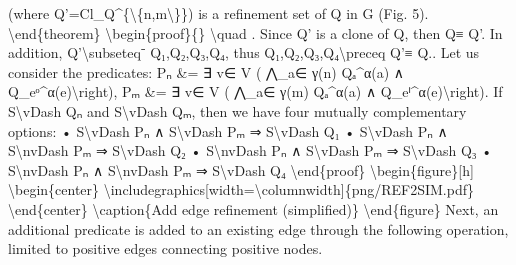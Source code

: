 \documentclass{article}%
\begin{document}
\newline%
(where Q'=Cl\_Q\^{}\{\textbackslash{}\{n,m\textbackslash{}\}\}) is a refinement set of Q in G (Fig. 5).\newline%
\textbackslash{}end\{theorem\}\newline%
\textbackslash{}begin\{proof\}\{\}\newline%
\textbackslash{}quad\newline%
. Since Q' is a clone of Q, then Q≡ Q'. In addition, Q'\textbackslash{}subseteq⁻ Q₁,Q₂,Q₃,Q₄, thus Q₁,Q₂,Q₃,Q₄\textbackslash{}preceq Q'≡ Q.. Let us consider the predicates:\newline%
\newline%
Pₙ \&= ∃ v∈ V ( ⋀\_a∈ γ(n) Qₐ\^{}α(a) ∧ Q\_eᵒ\^{}α(e)\textbackslash{}right),\newline%
Pₘ \&= ∃ v∈ V ( ⋀\_a∈ γ(m) Qₐ\^{}α(a) ∧ Q\_eⁱ\^{}α(e)\textbackslash{}right).\newline%
\newline%
If S\textbackslash{}vDash Qₙ and S\textbackslash{}vDash Qₘ, then we have four mutually complementary options:\newline%
   • S\textbackslash{}vDash Pₙ ∧ S\textbackslash{}vDash Pₘ ⇒ S\textbackslash{}vDash Q₁\newline%
   • S\textbackslash{}vDash Pₙ ∧ S\textbackslash{}nvDash Pₘ ⇒ S\textbackslash{}vDash Q₂\newline%
   • S\textbackslash{}nvDash Pₙ ∧ S\textbackslash{}vDash Pₘ ⇒ S\textbackslash{}vDash Q₃\newline%
   • S\textbackslash{}nvDash Pₙ ∧ S\textbackslash{}nvDash Pₘ ⇒ S\textbackslash{}vDash Q₄\newline%
\textbackslash{}end\{proof\}\newline%
\newline%
\textbackslash{}begin\{figure\}{[}h{]}\newline%
\textbackslash{}begin\{center\}\newline%
\textbackslash{}includegraphics{[}width=\textbackslash{}columnwidth{]}\{png/REF2SIM.pdf\}\newline%
\textbackslash{}end\{center\}\newline%
\textbackslash{}caption\{Add edge refinement (simplified)\}\newline%
\textbackslash{}end\{figure\}\newline%
\newline%
Next, an additional predicate is added to an existing edge through the following operation, limited to positive edges connecting positive nodes.\newline%
\end{document}

